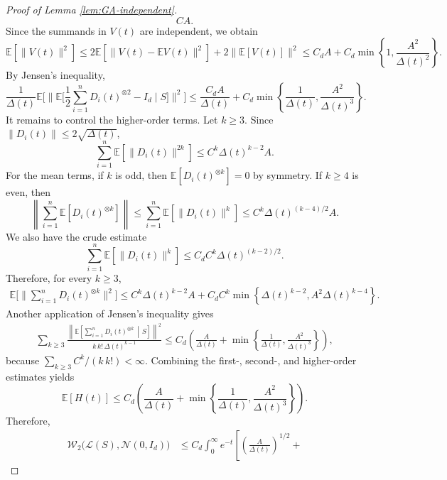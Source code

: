 \documentclass[11pt,letterpaper]{article}
\theoremstyle{plain}
\theoremstyle{definition}
\theoremstyle{remark}
\newcommand{\law}{\mathcal{L}}
\begin{document}
\begin{proof}[Proof of Lemma \ref{lem:GA-independent}]
\[CA .
\]
Since the summands in \(V(t)\) are independent, we obtain
\[
\mathbb E\left[\|V(t)\|^2\right] \le
2\mathbb E\left[\|V(t)-\mathbb EV(t)\|^2\right]
+
2\|\mathbb E\left[V(t)\right]\|^2                                \le
C_dA
+
C_d\min\left\{
    1,\frac{A^2}{\Delta(t)^2}
\right\}.
\]
By Jensen's inequality,
\[
\frac{1}{\Delta(t)}
\mathbb E\Big[
\big\|
    \mathbb E\big[
        \frac12\sum_{i=1}^nD_i(t)^{\otimes 2}-I_d
        \mid S
    \big]
\big\|^2\Big]                                                 \le
\frac{C_dA}{\Delta(t)}
+
C_d\min\left\{
    \frac1{\Delta(t)},
    \frac{A^2}{\Delta(t)^3}
\right\}.
\]
It remains to control the higher-order terms. Let \(k\ge3\). Since
\(\|D_i(t)\|\le 2\sqrt{\Delta(t)}\),
\[
    \sum_{i=1}^n
    \mathbb E\left[\|D_i(t)\|^{2k}\right]
    \le
    C^k \Delta(t)^{k-2} A .
\]
For the mean terms, if \(k\) is odd, then $\mathbb E\left[D_i(t)^{\otimes k}\right]=0$ by symmetry. If \(k\ge4\) is even, then
\[
\left\|
    \sum_{i=1}^n
    \mathbb E\left[D_i(t)^{\otimes k}\right]
\right\|
 \le
\sum_{i=1}^n
\mathbb E\left[\|D_i(t)\|^k\right]                                   \le
C^k \Delta(t)^{(k-4)/2}A .
\]
We also have the crude estimate
\[
    \sum_{i=1}^n
    \mathbb E\left[\|D_i(t)\|^k\right]
    \le
    C_d C^k \Delta(t)^{(k-2)/2}.
\]
Therefore, for every \(k\ge3\),
\[
\begin{aligned}
\mathbb E\Big[
\big\|
    \sum_{i=1}^n D_i(t)^{\otimes k}
\big\|^2\Big]
\le
C^k\Delta(t)^{k-2}A
+
C_d C^k
\min\left\{
    \Delta(t)^{k-2},
    A^2\Delta(t)^{k-4}
\right\}.
\end{aligned}
\]
Another application of Jensen's inequality gives
\[
\begin{aligned}
\sum_{k\ge 3}
\frac{\left\|
    \mathbb E\left[
        \sum_{i=1}^n D_i(t)^{\otimes k}
        \,\middle|\,S
    \right]
\right\|^2}{k\,k!\,\Delta(t)^{k-1}} \le
C_d
\left(
    \frac{A}{\Delta(t)}
    +
    \min\left\{
        \frac1{\Delta(t)},
        \frac{A^2}{\Delta(t)^3}
    \right\}
\right),
\end{aligned}
\]
because \(\sum_{k\ge3}C^k/(k\,k!)<\infty\). Combining the first-, second-, and higher-order estimates yields
\[
    \mathbb E [H(t)]
    \le
    C_d
    \left(
        \frac{A}{\Delta(t)}
        +
        \min\left\{
            \frac1{\Delta(t)},
            \frac{A^2}{\Delta(t)^3}
        \right\}
    \right).
\]
Therefore,
\[
\begin{aligned}
\mathcal W_2\bigl(\law(S),\mathcal N(0,I_d)\bigr)
&\le
C_d
\int_0^\infty e^{-t}
\left[
    \left(\frac{A}{\Delta(t)}\right)^{1/2}
    +

\end{aligned}\]
\end{proof}
\end{document}
